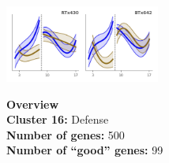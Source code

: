 \begin{multicols}{2}
\includegraphics[width=2in]{figures/clusters/leaf_Preflowering_15.png}
\columnbreak

\noindent \textbf{Overview}\\\textbf{Cluster 16:} Defense \\
\textbf{Number of genes:} 500 \\
\textbf{Number of ``good'' genes:} 99 \\
\end{multicols}

